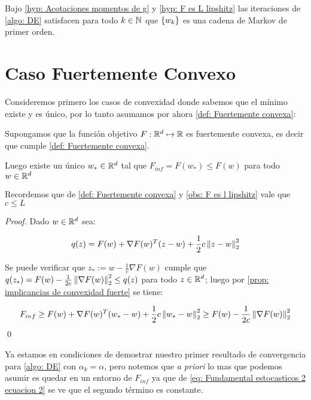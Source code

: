 \begin{corollary}
	\label{coro: DE es una cadena de markov}
	Bajo \ref{hyp: Acotaciones momentos de g} y \ref{hyp: F es L lipshitz} las iteraciones de \ref{algo: DE} satisfacen para todo $k \in {\mathbb{N}}$ que $\left\lbrace w_k\right\rbrace$ es una cadena de Markov de primer orden.
\end{corollary}

\section{Caso Fuertemente Convexo}
Consideremos primero los casos de convexidad donde sabemos que el m\'inimo existe y es \'unico, por lo tanto asumamos por ahora \ref{def: Fuertemente convexa}:

\begin{hyp}
	Supongamos que la funci\'on objetivo $F : {\mathbb{R}}^d \mapsto {\mathbb{R}}$ es fuertemente convexa, es decir que cumple \ref{def: Fuertemente convexa}.
	
	Luego existe un \'unico $w_{*} \in {\mathbb{R}}^d$ tal que $F_{inf} = F(w_*) \leq F(w)$ para todo $w \in {\mathbb{R}}^d$
	
\end{hyp}

Recordemos que de \ref{def: Fuertemente convexa} y \ref{obs: F es l lipshitz} vale que $c \leq L$ 

\begin{proof}
	Dado $w \in {\mathbb{R}}^d$ sea:
	
	\begin{equation*}
		q(z) = F(w) + \nabla F(w)^T (z-w) + \frac{1}{2} c \left\lVert z-w\right\rVert_2^2
	\end{equation*}
	
	Se puede verificar que $z_* := w - \frac{1}{c} \nabla F(w)$ cumple que $q(z_*) = F(w) - \frac{1}{2c} \left\lVert\nabla F(w)\right\rVert_2^2 \leq q(z)$ para todo $z \in {\mathbb{R}}^d$; luego por \ref{prop: implicancias de convexidad fuerte} se tiene:
	
	\begin{equation*}
		F_{inf} \geq F(w) + \nabla F(w)^T (w_*-w) + \frac{1}{2} c \left\lVert w_*-w\right\rVert_2^2 \geq F(w) - \frac{1}{2c} \left\lVert\nabla F(w)\right\rVert_2^2 
	\end{equation*}
	\qed
\end{proof}

Ya estamos en condiciones de demostrar nuestro primer resultado de convergencia para \ref{algo: DE} con $\alpha_k = \alpha$, pero notemos que \textit{a priori} lo mas que podemos asumir es quedar en un entorno de $F_{inf}$ ya que de \ref{eq: Fundamental estocasticos 2 ecuacion 2} se ve que el segundo t\'ermino es constante.

